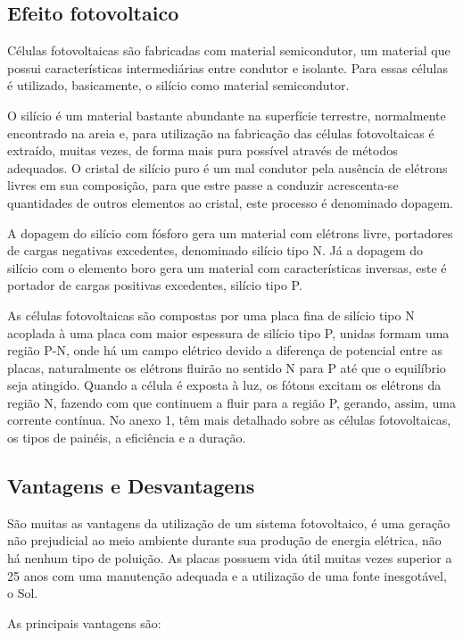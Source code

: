 \subsection{Efeito fotovoltaico}

Células fotovoltaicas são fabricadas com material semicondutor, um material que possui características intermediárias entre condutor e isolante. Para essas células é utilizado, basicamente, o silício como material semicondutor. 
	
O silício é um material bastante abundante na superfície terrestre, normalmente encontrado na areia e, para utilização na fabricação das células fotovoltaicas é extraído, muitas vezes, de forma mais pura possível através de métodos adequados. O cristal de silício puro é um mal condutor pela ausência de elétrons livres em sua composição, para que estre passe a conduzir acrescenta-se quantidades de outros elementos ao cristal, este processo é denominado dopagem.

A dopagem do silício com fósforo gera um material com elétrons livre, portadores de cargas negativas excedentes, denominado silício tipo N. Já a dopagem do silício com o elemento boro gera um material com características inversas, este é portador de cargas positivas excedentes, silício tipo P.

As células fotovoltaicas são compostas por uma placa fina de silício tipo N acoplada à uma placa com maior espessura de silício tipo P, unidas formam uma região P-N, onde há um campo elétrico devido a diferença de potencial entre as placas, naturalmente os elétrons fluirão no sentido N para P até que o equilíbrio seja atingido. Quando a célula é exposta à luz, os fótons excitam os elétrons da região N, fazendo com que continuem a fluir para a região P, gerando, assim, uma corrente contínua. No anexo 1, têm mais detalhado sobre as células fotovoltaicas, os tipos de painéis, a eficiência e a duração. 

\subsection{Vantagens e Desvantagens}

São muitas as vantagens da utilização de um sistema fotovoltaico, é uma geração não prejudicial ao meio ambiente durante sua produção de energia elétrica, não há nenhum tipo de poluição. As placas possuem vida útil muitas vezes superior a 25 anos com uma manutenção adequada e a utilização de uma fonte inesgotável, o Sol.

As principais vantagens são:

